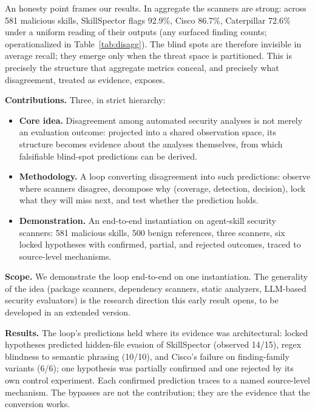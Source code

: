 \documentclass[sigconf,nonacm]{acmart}
\begin{document}
An honesty point frames our results.
In aggregate the scanners are strong: across 581 malicious skills, SkillSpector flags 92.9\%, Cisco 86.7\%, Caterpillar 72.6\% under a uniform reading of their outputs (any surfaced finding counts; operationalized in Table~\ref{tab:disagg}).
The blind spots are therefore invisible in average recall; they emerge only when the threat space is partitioned.
This is precisely the structure that aggregate metrics conceal, and precisely what disagreement, treated as evidence, exposes.

\noindent\textbf{Contributions.} Three, in strict hierarchy:
\begin{itemize}
  \item \textbf{Core idea.} Disagreement among automated security analyses is not merely an evaluation outcome: projected into a shared observation space, its structure becomes evidence about the analyses themselves, from which falsifiable blind-spot predictions can be derived.
  \item \textbf{Methodology.} A loop converting disagreement into such predictions: observe where scanners disagree, decompose why (coverage, detection, decision), lock what they will miss next, and test whether the prediction holds.
  \item \textbf{Demonstration.} An end-to-end instantiation on agent-skill security scanners: 581 malicious skills, 500 benign references, three scanners, six locked hypotheses with confirmed, partial, and rejected outcomes, traced to source-level mechanisms.
\end{itemize}

\noindent\textbf{Scope.} We demonstrate the loop end-to-end on one instantiation.
The generality of the idea (package scanners, dependency scanners, static analyzers, LLM-based security evaluators) is the research direction this early result opens, to be developed in an extended version.

\noindent\textbf{Results.} The loop's predictions held where its evidence was architectural: locked hypotheses predicted hidden-file evasion of SkillSpector (observed 14/15), regex blindness to semantic phrasing (10/10), and Cisco's failure on finding-family variants (6/6); one hypothesis was partially confirmed and one rejected by its own control experiment. Each confirmed prediction traces to a named source-level mechanism. The bypasses are not the contribution; they are the evidence that the conversion works.

\end{document}
